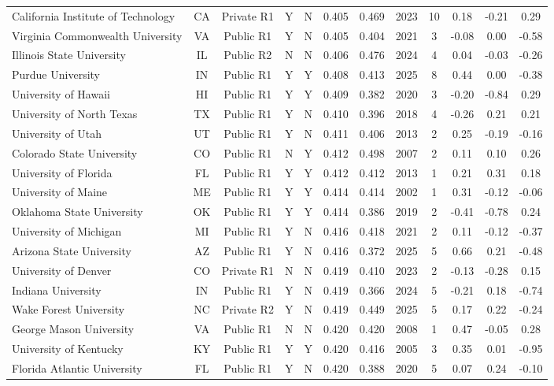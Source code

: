 \begin{longtable}{@{}p{3.55cm}ccccccccccc@{}}
California Institute of Technology & CA & Private R1 & Y & N & 0.405 & 0.469 & 2023 & 10 & 0.18 & -0.21 & 0.29 \\
Virginia Commonwealth University & VA & Public R1 & Y & N & 0.405 & 0.404 & 2021 & 3 & -0.08 & 0.00 & -0.58 \\
Illinois State University & IL & Public R2 & N & N & 0.406 & 0.476 & 2024 & 4 & 0.04 & -0.03 & -0.26 \\
Purdue University & IN & Public R1 & Y & Y & 0.408 & 0.413 & 2025 & 8 & 0.44 & 0.00 & -0.38 \\
University of Hawaii & HI & Public R1 & Y & Y & 0.409 & 0.382 & 2020 & 3 & -0.20 & -0.84 & 0.29 \\
University of North Texas & TX & Public R1 & Y & N & 0.410 & 0.396 & 2018 & 4 & -0.26 & 0.21 & 0.21 \\
University of Utah & UT & Public R1 & Y & N & 0.411 & 0.406 & 2013 & 2 & 0.25 & -0.19 & -0.16 \\
Colorado State University & CO & Public R1 & N & Y & 0.412 & 0.498 & 2007 & 2 & 0.11 & 0.10 & 0.26 \\
University of Florida & FL & Public R1 & Y & Y & 0.412 & 0.412 & 2013 & 1 & 0.21 & 0.31 & 0.18 \\
University of Maine & ME & Public R1 & Y & Y & 0.414 & 0.414 & 2002 & 1 & 0.31 & -0.12 & -0.06 \\
Oklahoma State University & OK & Public R1 & Y & Y & 0.414 & 0.386 & 2019 & 2 & -0.41 & -0.78 & 0.24 \\
University of Michigan & MI & Public R1 & Y & N & 0.416 & 0.418 & 2021 & 2 & 0.11 & -0.12 & -0.37 \\
Arizona State University & AZ & Public R1 & Y & N & 0.416 & 0.372 & 2025 & 5 & 0.66 & 0.21 & -0.48 \\
University of Denver & CO & Private R1 & N & N & 0.419 & 0.410 & 2023 & 2 & -0.13 & -0.28 & 0.15 \\
Indiana University & IN & Public R1 & Y & N & 0.419 & 0.366 & 2024 & 5 & -0.21 & 0.18 & -0.74 \\
Wake Forest University & NC & Private R2 & Y & N & 0.419 & 0.449 & 2025 & 5 & 0.17 & 0.22 & -0.24 \\
George Mason University & VA & Public R1 & N & N & 0.420 & 0.420 & 2008 & 1 & 0.47 & -0.05 & 0.28 \\
University of Kentucky & KY & Public R1 & Y & Y & 0.420 & 0.416 & 2005 & 3 & 0.35 & 0.01 & -0.95 \\
Florida Atlantic University & FL & Public R1 & Y & N & 0.420 & 0.388 & 2020 & 5 & 0.07 & 0.24 & -0.10 \\

\end{longtable}
